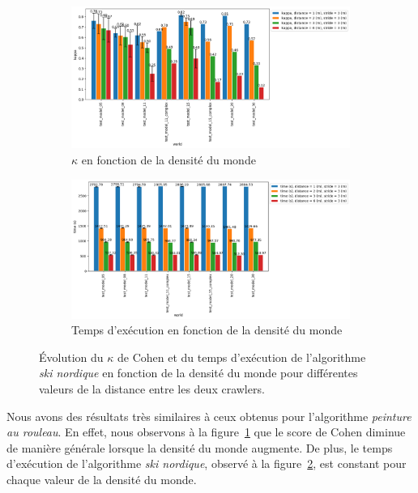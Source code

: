 \documentclass[francais,RandD]{rapportPFE}
\begin{document}
			\begin{figure}[h!]
				\centering
				\begin{subfigure}[t]{0.9\linewidth}
					\includegraphics[width=\linewidth]{graphics/ski_nordique-kappa_vs_world_for_each_d.png}
					\caption{$\kappa$ en fonction de la densité du monde}
					\label{fig:ski_nordique-kappa_vs_world_d}
				\end{subfigure}
				\hfill
				\begin{subfigure}[t]{0.9\linewidth}
						\includegraphics[width=\linewidth]{graphics/ski_nordique-time_vs_world_for_each_d.png}
						\caption{Temps d'exécution en fonction de la densité du monde}
						\label{fig:ski_nordique-time_vs_world_d}
				\end{subfigure}
				\caption{Évolution du $\kappa$ de Cohen et du temps d'exécution de l'algorithme \textit{ski nordique} en fonction de la densité du monde pour différentes valeurs de la distance entre les deux crawlers.}
				\label{fig:ski_nordique-world_d}
			\end{figure}

			Nous avons des résultats très similaires à ceux obtenus pour l'algorithme \textit{peinture au rouleau}.
			En effet, nous observons à la figure~\ref{fig:ski_nordique-kappa_vs_world_d} que le score de Cohen diminue de manière générale lorsque la densité du monde augmente.
			De plus, le temps d'exécution de l'algorithme \textit{ski nordique}, observé à la figure~\ref{fig:ski_nordique-time_vs_world_d}, est constant pour chaque valeur de la densité du monde.
\end{document}
